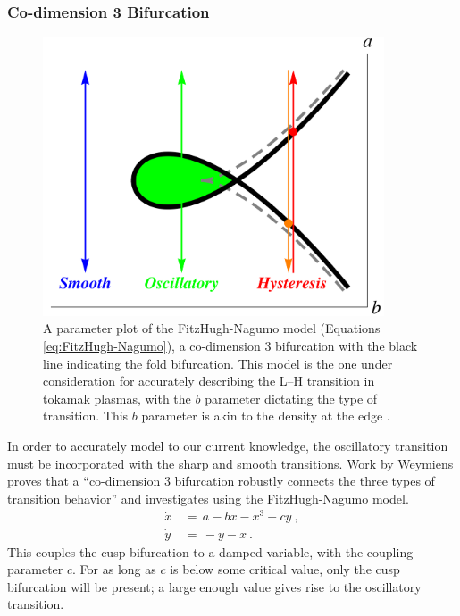 \subsubsection{Co-dimension 3 Bifurcation}
\begin{figure}[tb] %
\begin{minipage}{0.49\linewidth}
	\centering
	\includegraphics[width=0.9\textwidth]{../Graphics/Bif_Graphs/3_transitions_single_simple.png}
\end{minipage}
\hfill
\begin{minipage}{0.49\linewidth}
	\caption{A parameter plot of the FitzHugh-Nagumo model (Equations \ref{eq:FitzHugh-Nagumo}), a co-dimension 3 bifurcation with the black line indicating the fold bifurcation.
	This model is the one under consideration for accurately describing the L--H transition in tokamak plasmas, with the $b$ parameter dictating the type of transition.
	This $b$ parameter is akin to the density at the edge \cite{weymiens_bifurcation_2014}.}
	\label{fig:co-3}
\end{minipage}
\end{figure}

In order to accurately model to our current knowledge, the oscillatory transition must be incorporated with the sharp and smooth transitions.
Work by Weymiens \cite{weymiens_bifurcation_2014} proves that a ``co-dimension 3 bifurcation robustly connects the three types of transition behavior'' and investigates using the FitzHugh-Nagumo model.
\begin{subequations}
\begin{align} %
	\dot{x} \,&=\, a - bx - x^3 + cy~, \\
	\dot{y} \,&=\, -y - x~.
\end{align}
	\label{eq:FitzHugh-Nagumo}
\end{subequations}
This couples the cusp bifurcation to a damped variable, with the coupling parameter $c$.
For as long as $c$ is below some critical value, only the cusp bifurcation will be present; a large enough value gives rise to the oscillatory transition.

